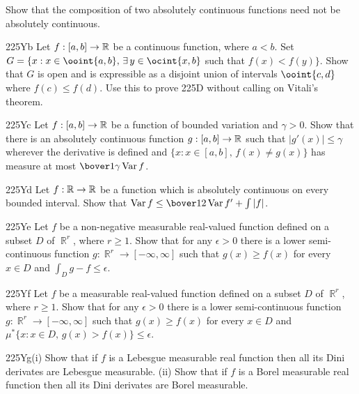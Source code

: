 {
Show that the composition of two absolutely
continuous functions need not be absolutely continuous.   

\spheader 225Yb Let $f:[a,b]\to\Bbb R$ be a continuous function, where
$a<b$.   Set $G=\{x:x\in\ooint{a,b},\,\exists\,y\in\ocint{x,b}$ such
that $f(x)<f(y)\}$.   Show that $G$ is open and is expressible as a
disjoint union of intervals $\ooint{c,d}$ where $f(c)\le f(d)$.   Use
this to prove 225D without calling on Vitali's theorem.

\spheader 225Yc Let $f:[a,b]\to\Bbb R$ be a function of bounded
variation and $\gamma>0$.   Show that there is an absolutely continuous
function $g:[a,b]\to\Bbb R$ such that $|g'(x)|\le\gamma$ wherever the
derivative is defined and $\{x:x\in[a,b],\,f(x)\ne g(x)\}$ has measure
at most $\bover1{\gamma}\Var f$.   

\spheader 225Yd
Let $f:\Bbb R\to\Bbb R$ be a function which is absolutely
continuous on every bounded interval.   Show that
$\Var f\le\bover12\Var f'+\int|f|$.

\spheader 225Ye Let $f$ be a non-negative measurable real-valued
function defined on a subset $D$ of $\BbbR^r$, where $r\ge 1$.   Show
that for any $\epsilon>0$ there is a lower semi-continuous
function $g:\BbbR^r\to[-\infty,\infty]$ such that $g(x)\ge f(x)$ for
every $x\in D$ and $\int_Dg-f\le\epsilon$.

\spheader 225Yf Let $f$ be a measurable real-valued function
defined on a subset $D$ of $\BbbR^r$, where $r\ge 1$.   Show that for
any $\epsilon>0$ there is a lower semi-continuous function
$g:\BbbR^r\to[-\infty,\infty]$ such that $g(x)\ge f(x)$ for every
$x\in D$ and
$\mu^*\{x:x\in D,\,g(x)>f(x)\}\le\epsilon$.   

\spheader 225Yg(i) Show that if $f$ is a Lebesgue measurable real function
then all its Dini derivates are Lebesgue measurable.
(ii) Show that if $f$ is a Borel measurable real function
then all its Dini derivates are Borel measurable.
}%


